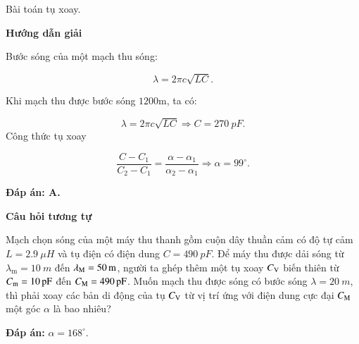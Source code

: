 \begin{dang}{Bài toán tụ xoay.}
	{	\begin{center}
			\textbf{Hướng dẫn giải}
		\end{center}
		
		Bước sóng của một mạch thu sóng:
		
		$$\lambda=2 \pi c \sqrt{L C}.$$
		
		Khi mạch thu được bước sóng $1200 \mathrm{m}$, ta có:
		
		$$\lambda=2 \pi c \sqrt{L C}  \Rightarrow C = \SI{270}{pF}.
		$$
		Công thức tụ xoay
		
		$$\dfrac{C-C_{1}}{C_{2}-C_{1}}=\dfrac{\alpha-\alpha_{1}}{\alpha_{2}-\alpha_{1}}  \Rightarrow \alpha=99^{\circ}.$$
		
		\textbf{Đáp án: A.}
		
		\begin{center}
			\textbf{Câu hỏi tương tự}
		\end{center}
		
		Mạch chọn sóng của một máy thu thanh gồm cuộn dây thuần cảm có độ tự cảm $L = \SI{2,9}{\mu H}$ và tụ điện có điện dung $C = \SI{490}{pF}$. Để máy thu được dải sóng từ $\lambda_\text{m} = \SI{10}{m}$ đến $\lambda_\text M = \SI{50}{m}$, người ta ghép thêm một tụ xoay $C_\text V$ biến thiên từ $C_\text m = \SI{10}{pF}$ đến $C_\text M = \SI{490}{pF}$. Muốn mạch thu được sóng có bước sóng $\lambda = \SI{20}{m}$, thì phải xoay các bản di động của tụ $C_\text V$ từ vị trí ứng với điện dung cực đại $C_\text M$ một góc $\alpha$ là bao nhiêu?
		
		\textbf{Đáp án:} $\alpha = 168^\circ.$
	}
\end{dang}
